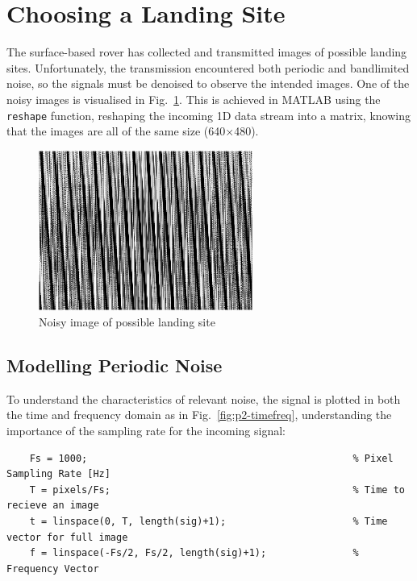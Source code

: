 \documentclass[12pt]{article}
\numberwithin{equation}{section}
\numberwithin{figure}{section}
\numberwithin{table}{section}
\begin{document}
%
%
\section{Choosing a Landing Site}

The surface-based rover has collected and transmitted images of possible
landing sites. Unfortunately, the transmission encountered both periodic and
bandlimited noise, so the signals must be denoised to observe the intended
images. One of the noisy images is visualised in Fig.~\ref{fig:p2-noisy}. This
is achieved in MATLAB using the \verb+reshape+ function, reshaping the incoming
1D data stream into a matrix, knowing that the images are all of the same size
(640$\times$480).

\begin{figure}[ht]
    \centering
    \includegraphics[width=7cm]{figures/p2-noisy.png}
    \caption{Noisy image of possible landing site\label{fig:p2-noisy}}
\end{figure}

\subsection{Modelling Periodic Noise}

To understand the characteristics of relevant noise, the signal is plotted in
both the time and frequency domain as in Fig.~\ref{fig:p2-timefreq},
understanding the importance of the sampling rate for the incoming signal:
\begin{verbatim}
    Fs = 1000;                                              % Pixel Sampling Rate [Hz]
    T = pixels/Fs;                                          % Time to recieve an image
    t = linspace(0, T, length(sig)+1);                      % Time vector for full image
    f = linspace(-Fs/2, Fs/2, length(sig)+1);               % Frequency Vector
\end{verbatim}
\end{document}
